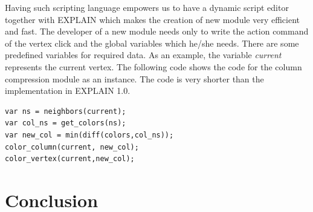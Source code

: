 \documentclass[12pt, oneside]{book}
\begin{document}
Having such scripting language empowers us to have a dynamic script editor 
together with EXPLAIN which makes the creation of new module very efficient and fast.
The developer of a new module needs only to write the action command of the vertex
click and the global variables which he/she needs.
There are some predefined variables for required data.
As an example, the variable \textit{current} represents the current vertex.
The following code shows the code for the column compression 
module as an instance. The code is very shorter than the implementation in EXPLAIN 1.0.
\begin{lstlisting}
var ns = neighbors(current);
var col_ns = get_colors(ns);
var new_col = min(diff(colors,col_ns));
color_column(current, new_col);
color_vertex(current,new_col);
\end{lstlisting}
\chapter{Conclusion}
\label{conc}


\end{document}
